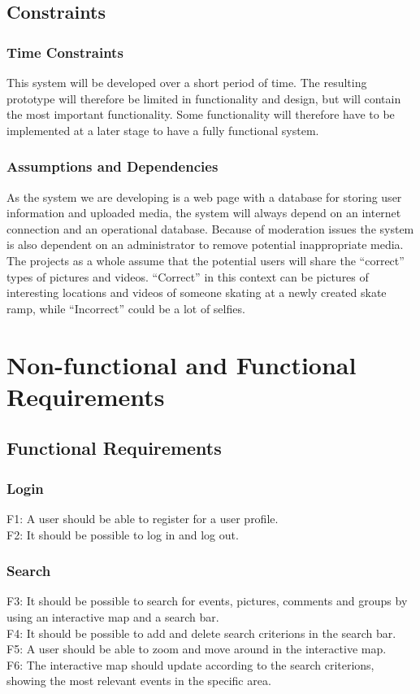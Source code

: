 \subsection{Constraints}
\label{subsec:SysReqIntroConstr}

\subsubsection*{Time Constraints} 
This system will be developed over a short period of time. The resulting prototype will therefore be limited in functionality and design, but will contain the most important functionality. Some functionality will therefore have to be implemented at a later stage to have a fully functional system.
\subsubsection*{Assumptions and Dependencies} As the system we are developing is a web page with a database for storing user information and uploaded media, the system will always depend on an internet connection and an operational database. Because of moderation issues the system is also dependent on an administrator to remove potential inappropriate  media. The projects as a whole assume that the potential users will share the “correct” types of pictures and videos. “Correct” in this context can be pictures of interesting locations and videos of someone skating at a newly created skate ramp, while  “Incorrect” could be a lot of selfies.

\section{Non-functional and Functional Requirements}
\label{sec:SysReqReqs}

\subsection{Functional Requirements}
\label{subsec:SysReqReqsFunc}

\subsubsection{Login}
F1: A user should be able to register for a user profile. \\
F2: It should be possible to log in and log out.

\subsubsection{Search}
F3: It should be possible to search for events, pictures, comments and groups by using an interactive map and a search bar. \\
F4: It should be possible to add and delete search criterions in the search bar. \\
F5: A user should be able to zoom and move around in the interactive map. \\
F6: The interactive map should update according to the search criterions, showing the most relevant events in the specific area.

